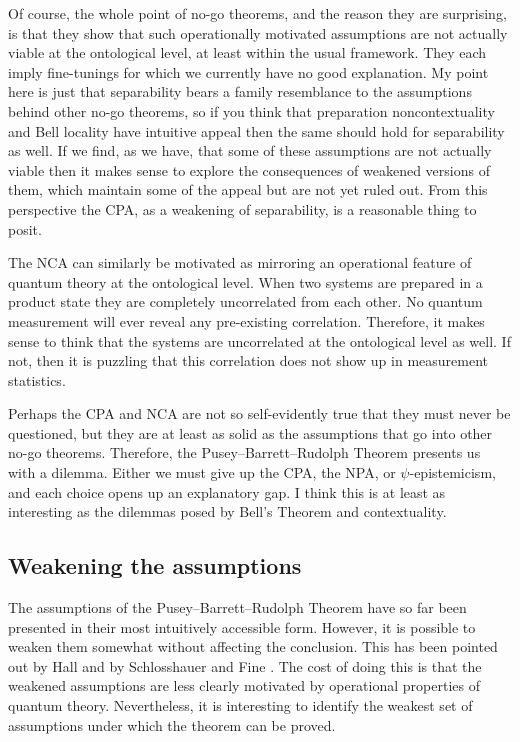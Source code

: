 \documentclass[DIV=calc,paper=a4,fontsize=11pt,twocolumn]{scrartcl} %
\theoremstyle{definition}
\theoremstyle{plain}
\begin{document}
Of course, the whole point of no-go theorems, and the reason they are
surprising, is that they show that such operationally motivated
assumptions are not actually viable at the ontological level, at least
within the usual framework.  They each imply fine-tunings for which we
currently have no good explanation.  My point here is just that
separability bears a family resemblance to the assumptions behind
other no-go theorems, so if you think that preparation
noncontextuality and Bell locality have intuitive appeal then the same
should hold for separability as well.  If we find, as we have, that
some of these assumptions are not actually viable then it makes sense
to explore the consequences of weakened versions of them, which
maintain some of the appeal but are not yet ruled out.  From this
perspective the CPA, as a weakening of separability, is a reasonable
thing to posit.

The NCA can similarly be motivated as mirroring an operational feature
of quantum theory at the ontological level.  When two systems are
prepared in a product state they are completely uncorrelated from each
other.  No quantum measurement will ever reveal any pre-existing
correlation.  Therefore, it makes sense to think that the systems are
uncorrelated at the ontological level as well.  If not, then it is
puzzling that this correlation does not show up in measurement
statistics.

Perhaps the CPA and NCA are not so self-evidently true that they must
never be questioned, but they are at least as solid as the assumptions
that go into other no-go theorems.  Therefore, the Pusey--Barrett--Rudolph Theorem
presents us with a dilemma.  Either we must give up the CPA, the NPA,
or $\psi$-epistemicism, and each choice opens up an explanatory gap.
I think this is at least as interesting as the dilemmas posed by
Bell's Theorem and contextuality.

\subsection{Weakening the assumptions}

\label{WPusey--Barrett--Rudolph}

The assumptions of the Pusey--Barrett--Rudolph Theorem have so far been presented in their
most intuitively accessible form.  However, it is possible to weaken
them somewhat without affecting the conclusion.  This has been pointed
out by Hall \cite{Hall2011} and by Schlosshauer and Fine
\cite{Schlosshauer2012}.  The cost of doing this is that the weakened
assumptions are less clearly motivated by operational properties of
quantum theory.  Nevertheless, it is interesting to identify the
weakest set of assumptions under which the theorem can be proved.
\end{document}
